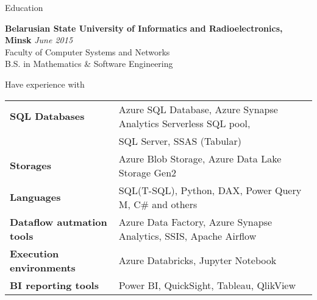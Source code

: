 \documentclass{resume} %
\begin{document}

\begin{rSection}{Education}

{\bf Belarusian State University of Informatics and Radioelectronics, Minsk} \hfill {\em June 2015} \\ 
Faculty of Computer Systems and Networks \\
B.S. in Mathematics \& Software Engineering \\

\end{rSection}


\begin{rSection}{Have experience with}

\begin{tabular}{ @{} >{\bfseries}l @{\hspace{6ex}} l }
SQL Databases          & Azure SQL Database, Azure Synapse Analytics Serverless SQL pool, \smallskip \\
 & SQL Server, SSAS (Tabular) \smallskip \\
Storages  & Azure Blob Storage, Azure Data Lake Storage Gen2 \smallskip \\
Languages  & SQL(T-SQL), Python, DAX, Power Query M, C\# and others \smallskip \\
Dataflow autmation tools & Azure Data Factory, Azure Synapse Analytics, SSIS, Apache Airflow \smallskip \\
Execution environments & Azure Databricks, Jupyter Notebook \smallskip \\
BI reporting tools               & Power BI, QuickSight, Tableau, QlikView \smallskip \\
\end{tabular}

\end{rSection}

\end{document}
